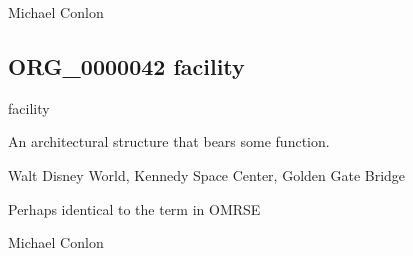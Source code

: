 \documentclass[letterpaper,10pt,english]{sphinxmanual}
\begin{document}
\begin{sphinxShadowBox}

\sphinxAtStartPar
Michael Conlon 
\end{sphinxShadowBox}
\begin{quote}

\ignorespaces \end{quote}


\subsection{ORG\_0000042 \sphinxhyphen{} facility}
\label{\detokenize{doc-ORG_0000042:org-0000042-facility}}\label{\detokenize{doc-ORG_0000042:index-0}}\label{\detokenize{doc-ORG_0000042::doc}}
\begin{sphinxShadowBox}

\sphinxAtStartPar
facility
\end{sphinxShadowBox}

\begin{sphinxShadowBox}

\sphinxAtStartPar
An architectural structure that bears some function.
\end{sphinxShadowBox}

\begin{sphinxShadowBox}

\sphinxAtStartPar
{}
\end{sphinxShadowBox}

\begin{sphinxShadowBox}

\sphinxAtStartPar
Walt Disney World, Kennedy Space Center, Golden Gate Bridge
\end{sphinxShadowBox}

\begin{sphinxShadowBox}

\sphinxAtStartPar
Perhaps identical to the term in OMRSE
\end{sphinxShadowBox}

\begin{sphinxShadowBox}

\sphinxAtStartPar
Michael Conlon 
\end{sphinxShadowBox}
\end{document}
